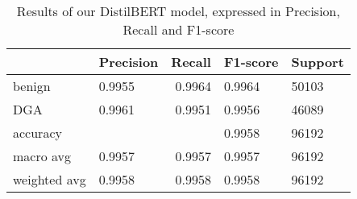 \begin{table}[!htb]
    \centering
    \begin{tabular}{llrll}
        \hline
                     & Precision & Recall & F1-score & Support \\ \hline
        benign       & 0.9955    & 0.9964 & 0.9964   & 50103   \\
        DGA          & 0.9961    & 0.9951 & 0.9956   & 46089   \\ \hline
        accuracy     &           &        & 0.9958   & 96192   \\
        macro avg    & 0.9957    & 0.9957 & 0.9957   & 96192   \\
        weighted avg & 0.9958    & 0.9958 & 0.9958   & 96192   \\ \hline
    \end{tabular}
    \caption{Results of our DistilBERT model, expressed in Precision, Recall and F1-score}
    \label{general_results}
\end{table}

